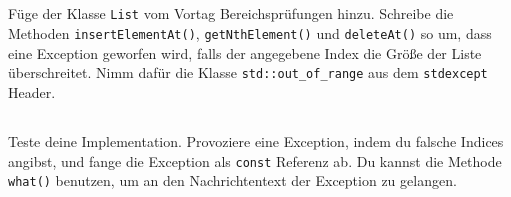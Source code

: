 \subsection{}
Füge der Klasse \texttt{List} vom Vortag Bereichsprüfungen hinzu.
Schreibe die Methoden \texttt{insertElementAt()}, \texttt{getNthElement()} und \texttt{deleteAt()} so um, dass eine Exception geworfen wird, falls der angegebene Index die Größe der Liste überschreitet.
Nimm dafür die Klasse \texttt{std::out\_of\_range} aus dem \texttt{stdexcept} Header.

\subsection{}
Teste deine Implementation.
Provoziere eine Exception, indem du falsche Indices angibst, und fange die Exception als \texttt{const} Referenz ab. Du kannst die Methode \texttt{what()} benutzen, um an den Nachrichtentext der Exception zu gelangen.
